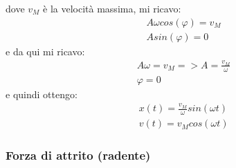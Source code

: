             dove $v_M$ è la velocità massima, mi ricavo:
            \begin{align*}
                &A\omega cos(\varphi)=v_M\\
                &Asin(\varphi)=0
            \end{align*}
            e da qui mi ricavo:
            \begin{align*}
                &A\omega=v_M=>A=\frac{v_M}{\omega}\\
                &\varphi=0
            \end{align*}
            e quindi ottengo:
            \begin{align*}
                &x(t)=\frac{v_M}{\omega}sin(\omega t)\\
                &v(t)=v_Mcos(\omega t)
            \end{align*}


        \subsubsection{Forza di attrito (radente)}
